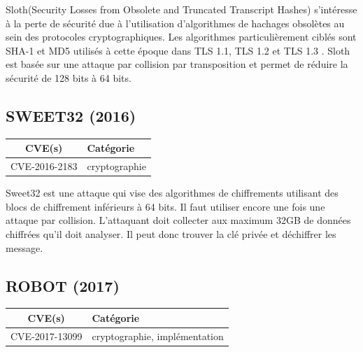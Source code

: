 \vspace{1em}

Sloth(Security Losses from Obsolete and Truncated Transcript Hashes) s'intéresse à la perte de sécurité due à l'utilisation d'algorithmes de hachages obsolètes au sein des protocoles cryptographiques. Les algorithmes particulièrement ciblés sont SHA-1 et MD5 utilisés à cette époque dans TLS 1.1, TLS 1.2 et TLS 1.3 . Sloth est basée sur une attaque par collision par transposition et permet de réduire la sécurité de 128 bits à 64 bits\cite{sloth}.




\subsection{SWEET32 (2016)}

\begin{tabularx}{0.96\textwidth}{|c|X|}
  \hline
  \textbf{CVE(s)} & \textbf{Catégorie} \\
  \hline
  CVE-2016-2183 & cryptographie \\
  \hline
\end{tabularx}

\vspace{1em}

Sweet32 est une attaque qui vise des algorithmes de chiffrements utilisant des blocs de chiffrement inférieurs à 64 bits. Il faut utiliser encore une fois une attaque par collision. L'attaquant doit collecter aux maximum 32GB de données chiffrées qu'il doit analyser. Il peut donc trouver la clé privée et déchiffrer les message\cite{sweet32}.




\subsection{ROBOT (2017)}

\begin{tabularx}{0.96\textwidth}{|c|X|}
  \hline
  \textbf{CVE(s)} & \textbf{Catégorie} \\
  \hline
  CVE-2017-13099 & cryptographie, implémentation \\
  \hline
\end{tabularx}

